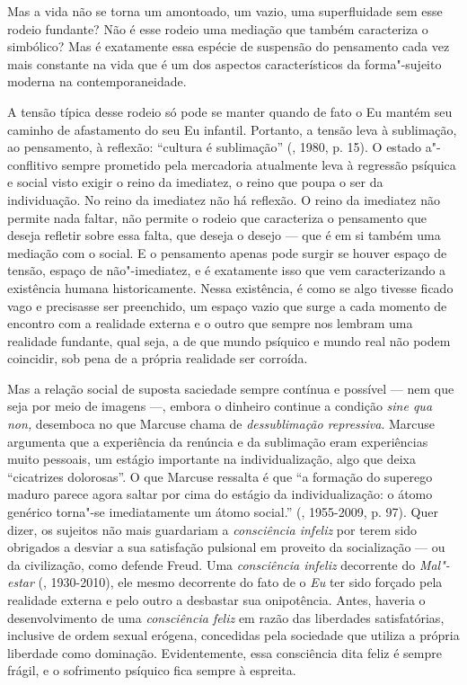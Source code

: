 Mas a vida não se torna um amontoado, um vazio, uma superfluidade sem
esse rodeio fundante? Não é esse rodeio uma mediação que também
caracteriza o simbólico? Mas é exatamente essa espécie de suspensão do
pensamento cada vez mais constante na vida que é um dos aspectos
característicos da forma"-sujeito moderna na contemporaneidade.

A tensão típica desse rodeio só pode se manter quando de fato o Eu
mantém seu caminho de afastamento do seu Eu infantil. Portanto, a tensão
leva à sublimação, ao pensamento, à reflexão: ``cultura é sublimação''
(, 1980, p. 15). O estado a"-conflitivo sempre prometido pela
mercadoria atualmente leva à regressão psíquica e social visto exigir o
reino da imediatez, o reino que poupa o ser da individuação. No reino da
imediatez não há reflexão. O reino da imediatez não permite nada faltar,
não permite o rodeio que caracteriza o pensamento que deseja refletir
sobre essa falta, que deseja o desejo --- que é em si também uma
mediação com o social. E o pensamento apenas pode surgir se houver
espaço de tensão, espaço de não"-imediatez, e é exatamente isso que vem
caracterizando a existência humana historicamente. Nessa existência, é
como se algo tivesse ficado vago e precisasse ser preenchido, um espaço
vazio que surge a cada momento de encontro com a realidade externa e o
outro que sempre nos lembram uma realidade fundante, qual seja, a de que mundo psíquico e mundo real não podem coincidir, sob pena de a própria realidade ser corroída.

Mas a relação social de suposta saciedade sempre contínua e possível ---
nem que seja por meio de imagens ---, embora o dinheiro continue a
condição \emph{sine qua non,} desemboca no que Marcuse chama de
\emph{dessublimação repressiva}. Marcuse argumenta que a experiência da
renúncia e da sublimação eram experiências muito pessoais, um estágio
importante na individualização, algo que deixa ``cicatrizes dolorosas''.
O que Marcuse ressalta é que ``a formação do superego maduro parece
agora saltar por cima do estágio da individualização: o átomo genérico
torna"-se imediatamente um átomo social.'' (, 1955-2009, p. 97).
Quer dizer, os sujeitos não mais guardariam a \emph{consciência infeliz}
por terem sido obrigados a desviar a sua satisfação pulsional em
proveito da socialização --- ou da civilização, como defende Freud. Uma
\emph{consciência infeliz} decorrente do \emph{Mal"-estar} (,
1930-2010), ele mesmo decorrente do fato de o \emph{Eu} ter sido forçado
pela realidade externa e pelo outro a desbastar sua onipotência. Antes,
haveria o desenvolvimento de uma \emph{consciência feliz} em razão das
liberdades satisfatórias, inclusive de ordem sexual erógena, concedidas
pela sociedade que utiliza a própria liberdade como dominação. Evidentemente, essa consciência dita feliz é sempre frágil, e o sofrimento psíquico fica sempre à espreita.

